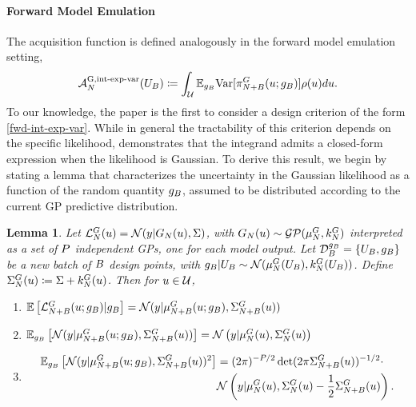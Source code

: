 \documentclass[12pt]{article}
\newtheorem{lemma}{Lemma}
\begin{document}
\paragraph{Forward Model Emulation}
The acquisition function is defined analogously in the forward model emulation setting, 
\begin{align}
\labelAcq[\Ndesign]{\fwdintExpVarLabel}(\designBatchIn) \Def
\int_{\parSpace} \E_{\designBatchFwd} \Var[\fwdEmRdm[\Naugment]{\postDens}(\Par; \designBatchFwd)] \weightDens(\Par) d\Par. \label{fwd-int-exp-var}
\end{align}
To our knowledge, 
the paper \cite{SinsbeckNowak} is the first to consider a design criterion of the form \ref{fwd-int-exp-var}. 
While in general the tractability of this criterion depends on the specific likelihood, \cite{Surer2023sequential} 
demonstrates that the integrand admits a closed-form expression when the likelihood is Gaussian. 
To derive this result, we begin by stating a lemma that characterizes the uncertainty in the Gaussian 
likelihood as a function of the random quantity $\designBatchFwd$, assumed to be distributed according 
to the current GP predictive distribution. 
\begin{lemma} \label{lemma:fwd-Gaussian-density-dist}
Let $\llikEmFwd(\Par) = \Gaussian(\obs | \fwdEm(\Par), \likPar)$, with 
$\fwdEm(\Par) \sim \GP(\emMean[\Ndesign]{\fwd}, \emKer[\Ndesign]{\fwd})$ interpreted as a set of $\dimObs$ independent 
GPs, one for each model output. Let $\designRand[\Nbatch]{\designBatchFwd} = \{\designBatchIn, \designBatchFwd\}$ be a new batch of $\Nbatch$ 
design points, with
$\designBatchFwd | \designBatchIn \sim \Gaussian(\emMean[\Ndesign]{\fwd}(\designBatchIn), \emKer[\Ndesign]{\fwd}(\designBatchIn))$. 
Define $\CovComb[\Ndesign](\Par) \Def \likPar + \emKer[\Ndesign]{\fwd}(\Par)$. 
Then for $\Par \in \parSpace$,
\begin{enumerate}
\item $\E\left[\llikEmFwd[\Naugment](\Par; \designBatchFwd) | \designBatchFwd \right] = \Gaussian(\obs | \emMean[\Naugment]{\fwd}(\Par; \designBatchFwd), \CovComb[\Naugment](\Par))$
\item $\E_{\designBatchFwd} \left[\Gaussian(\obs | \emMean[\Naugment]{\fwd}(\Par; \designBatchFwd), \CovComb[\Naugment](\Par))\right]
= \Gaussian\left(\obs | \emMean[\Ndesign]{\fwd}(\Par), \CovComb[\Ndesign](\Par)\right)$
\item 
\begin{align*}
\E_{\designBatchFwd} \left[\Gaussian(\obs | \emMean[\Naugment]{\fwd}(\Par; \designBatchFwd), \CovComb[\Naugment](\Par))^2\right] &= 
(2\pi)^{-\dimObs/2} \det(2\pi \CovComb[\Naugment](\Par))^{-1/2} \cdot \\
&\Gaussian\left(\obs | \emMean[\Ndesign]{\fwd}(\Par), \CovComb[\Ndesign](\Par) - \frac{1}{2} \CovComb[\Naugment](\Par) \right). 
\end{align*}
\end{enumerate}
\end{lemma}
\end{document}

